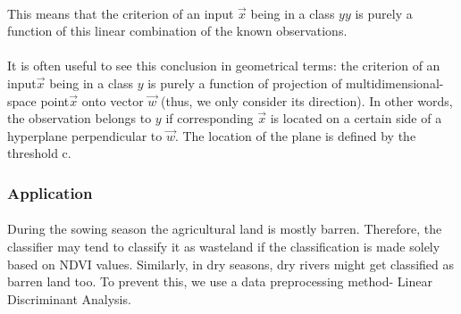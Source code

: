 \documentclass[12pt, a4paper]{report}
\begin{document}
\paragraph{}
This means that the criterion of an input ${\displaystyle {\vec {x}}}$ being in a class ${\displaystyle y}y$ is purely a function of this linear combination of the known observations.
\paragraph{}
It is often useful to see this conclusion in geometrical terms: the criterion of an input${\displaystyle {\vec {x}}}$ being in a class $y$ is purely a function of projection of multidimensional-space point${\displaystyle {\vec {x}}}$ onto vector ${\displaystyle {\vec {w}}}$ (thus, we only consider its direction). In other words, the observation belongs to $y$ if corresponding ${\displaystyle {\vec {x}}}$ is located on a certain side of a hyperplane perpendicular to ${\displaystyle {\vec {w}}}$. The location of the plane is defined by the threshold c.

\subsubsection{Application}
\paragraph{}
 During the sowing season the agricultural land is mostly barren. Therefore, the classifier may tend to classify it as wasteland if the classification is made solely based on NDVI values. Similarly, in dry seasons, dry rivers might get classified as barren land too. To prevent this, we use a data preprocessing method- Linear Discriminant Analysis.
\end{document}
